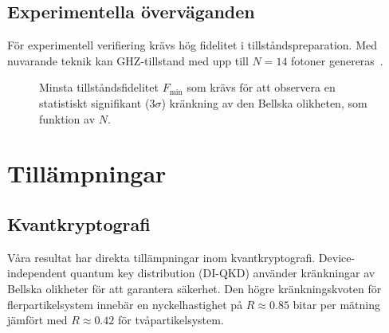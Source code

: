 \documentclass[12pt,a4paper]{article}
\theoremstyle{plain}
\theoremstyle{definition}
\theoremstyle{remark}
\begin{document}
\subsection{Experimentella \"overv\"aganden}

F\"or experimentell verifiering kr\"avs h\"og fidelitet i
tillst\r{a}ndspreparation. Med nuvarande teknik kan GHZ-tillstand
med upp till $N = 14$ fotoner genereras~\citep{wang2018}.

\begin{figure}[ht]
\centering
{}
\caption{Minsta tillst\r{a}ndsfidelitet $F_{\min}$ som kr\"avs
f\"or att observera en statistiskt signifikant (3$\sigma$)
kr\"ankning av den Bellska olikheten, som funktion av $N$.}
\label{fig:fidelity}
\end{figure}

\section{Till\"ampningar}
\label{sec:tillamningar}

\subsection{Kvantkryptografi}

V\r{a}ra resultat har direkta till\"ampningar inom kvantkryptografi.
Device-independent quantum key distribution (DI-QKD) anv\"ander
kr\"ankningar av Bellska olikheter f\"or att garantera s\"akerhet.
Den h\"ogre kr\"ankningskvoten f\"or flerpartikelsystem inneb\"ar
en nyckelhastighet p\r{a} $R \approx 0.85$ bitar per m\"atning
j\"amf\"ort med $R \approx 0.42$ f\"or tv\r{a}partikelsystem.
\end{document}
